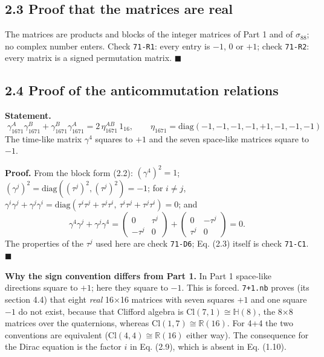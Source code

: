 \documentclass[
  10pt,
]{article}
\begin{document}
\hypertarget{proof-that-the-matrices-are-real-1}{%
\subsection{2.3 Proof that the matrices are
real}\label{proof-that-the-matrices-are-real-1}}

The matrices are products and blocks of the integer matrices of Part 1
and of \(\sigma_{88}\); no complex number enters. Check \texttt{71-R1}:
every entry is \(-1\), \(0\) or \(+1\); check \texttt{71-R2}: every
matrix is a signed permutation matrix. \(\blacksquare\)

\hypertarget{proof-of-the-anticommutation-relations-1}{%
\subsection{2.4 Proof of the anticommutation
relations}\label{proof-of-the-anticommutation-relations-1}}

\textbf{Statement.}
\[\boxed{\;\gamma_{1671}^A\gamma_{1671}^B+\gamma_{1671}^B\gamma_{1671}^A=2\,\eta_{1671}^{AB}\,1_{16},\qquad
\eta_{1671}=\mathrm{diag}(-1,-1,-1,-1,+1,-1,-1,-1)\;}\tag{2.3}\] The
time-like matrix \(\gamma^4\) squares to \(+1\) and the seven space-like
matrices square to \(-1\).

\textbf{Proof.} From the block form (2.2): \((\gamma^4)^2=1\);
\((\gamma^j)^2=\mathrm{diag}((\tau^j)^2,(\tau^j)^2)=-1\); for
\(i\ne j\),
\(\gamma^i\gamma^j+\gamma^j\gamma^i=\mathrm{diag}(\tau^i\tau^j+\tau^j\tau^i,\ \tau^i\tau^j+\tau^j\tau^i)=0\);
and
\[\gamma^4\gamma^j+\gamma^j\gamma^4=\begin{pmatrix}0&\tau^j\\-\tau^j&0\end{pmatrix}+\begin{pmatrix}0&-\tau^j\\ \tau^j&0\end{pmatrix}=0 .\]
The properties of the \(\tau^j\) used here are check \texttt{71-D6}; Eq.
(2.3) itself is check \texttt{71-C1}. \(\blacksquare\)

\textbf{Why the sign convention differs from Part 1.} In Part 1
space-like directions square to \(+1\); here they square to \(-1\). This
is forced. \texttt{7+1.nb} proves (its section 4.4) that eight
\emph{real} 16×16 matrices with seven squares \(+1\) and one square
\(-1\) do not exist, because that Clifford algebra is
\(\mathrm{Cl}(7,1)\cong\mathbb{H}(8)\), the 8×8 matrices over the
quaternions, whereas \(\mathrm{Cl}(1,7)\cong\mathbb{R}(16)\). For 4+4
the two conventions are equivalent
(\(\mathrm{Cl}(4,4)\cong\mathbb{R}(16)\) either way). The consequence
for the Dirac equation is the factor \(i\) in Eq. (2.9), which is absent
in Eq. (1.10).
\end{document}
